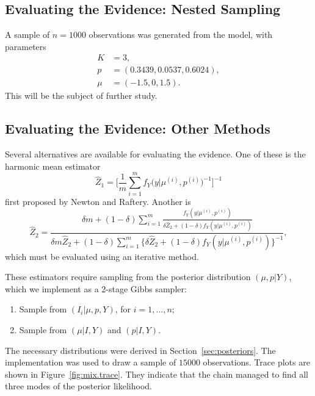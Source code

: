 \documentclass[11pt]{article}
\begin{document}
\subsection{Evaluating the Evidence: Nested Sampling}
A sample of $n = 1000$ observations was generated from the model, 
with parameters
\begin{align*}
    K &= 3, \\
    p &= (0.3439, 0.0537, 0.6024), \\
    \mu &= (-1.5, 0, 1.5).
\end{align*}
This will be the subject of further study.

\subsection{Evaluating the Evidence: Other Methods}
Several alternatives are available for evaluating the evidence.
One of these is the harmonic mean estimator
\[
    \hat{Z}_1
    =
    \biggl[
        \frac{1}{m} \sum_{i=1}^m
        f_{Y}\bigl( y \vert \mu^{(i)}, p^{(i)} \bigr)^{-1}
    \biggr]^{-1}
\]
first proposed by Newton and Raftery. 
Another is
\[
    \hat{Z}_2
    =
    \frac{
        \delta m + (1 - \delta) \sum_{i=1}^m \frac{ 
            f_{Y}(y \vert \mu^{(i)}, p^{(i)}) 
        }{ 
            \delta \hat{Z}_2 + (1 - \delta) f_{Y}(y \vert \mu^{(i)}, p^{(i)}) 
        }
    }{
        \delta m \hat{Z}_2 
        + (1 - \delta) \sum_{i=1}^m \{\delta\hat{Z}_2 
        + (1 - \delta) f_{Y}(y \vert \mu^{(i)}, p^{(i)}) \}^{-1}
    },
\]
which must be evaluated using an iterative method.

These estimators require sampling from the posterior distribution 
$(\mu, p \vert Y)$, which we implement as a 2-stage Gibbs sampler:
\begin{enumerate}
\item Sample from $(I_i \vert \mu, p, Y)$, for $i = 1, \ldots, n$;
\item Sample from $(\mu \vert I, Y)$ and $(p \vert I, Y)$.
\end{enumerate}
The necessary distributions were derived in Section~\ref{sec:posteriors}.
The implementation was used to draw a sample of $15000$ observations.
Trace plots are shown in Figure~\ref{fig:mix.trace}.
They indicate that the chain managed to find all three modes of the posterior
likelihood.
\end{document}
